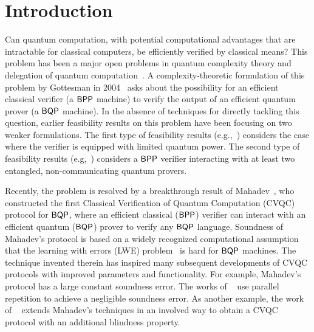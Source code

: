 \section{Introduction}

Can quantum computation, with potential computational advantages that are intractable for classical computers,
be efficiently verified by classical means?
This problem has been a major open problems in quantum complexity theory and delegation of quantum computation~\cite{web:Aaronson}. A complexity-theoretic formulation of this problem by Gottesman in 2004~\cite{web:Aaronson} asks about the possibility for an efficient classical verifier (a $\operatorname{\mathsf{BPP}}$ machine) to verify the output of an
efficient quantum prover (a $\operatorname{\mathsf{BQP}}$ machine).
In the absence of techniques for directly tackling this question, earlier feasibility results on this problem have been focusing on two weaker formulations.
The first type of feasibility results (e.g.,~\cite{BFK09,arXiv:ABOEM17,FK17,mf16}) considers the case where the verifier is equipped with limited quantum power.
The second type of feasibility results (e.g,~\cite{Nat:RUV13, CGJV19, Gheorghiu_2015, HPF15})
considers a $\operatorname{\mathsf{BPP}}$ verifier interacting with at least two entangled, non-communicating quantum provers.

Recently, the problem is resolved by a breakthrough result of Mahadev~\cite{FOCS:Mahadev18a}, who constructed the first Classical Verification of Quantum Computation (CVQC) protocol for $\operatorname{\mathsf{BQP}}$, where an efficient classical ($\operatorname{\mathsf{BPP}}$) verifier can interact with an efficient quantum ($\operatorname{\mathsf{BQP}}$) prover to verify any $\operatorname{\mathsf{BQP}}$ language. Soundness of Mahadev's protocol  is based on a widely recognized computational assumption that the learning with errors (LWE) problem~\cite{JACM:Regev09} is hard for $\operatorname{\mathsf{BQP}}$ machines.
The technique invented therein has inspired many subsequent developments of CVQC protocols with improved parameters and functionality. For example, Mahadev's protocol has a large constant soundness error. The works of ~\cite{arXiv:AlaChiHun19,arXiv:ChiaChungYam19} use parallel repetition to achieve a negligible soundness error. As another example, the work of ~\cite{FOCS:GheVid19} extends Mahadev's techniques in an involved way to obtain a CVQC protocol with an additional blindness property.  

